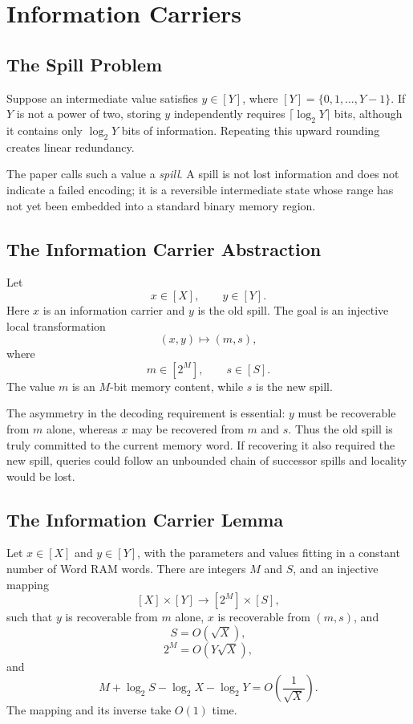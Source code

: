 \section{Information Carriers}
\label{sec:information-carriers}

\subsection{The Spill Problem}

Suppose an intermediate value satisfies \(y\in[Y]\), where
\([Y]=\{0,1,\ldots,Y-1\}\). If \(Y\) is not a power of two, storing \(y\)
independently requires \(\lceil\log_2Y\rceil\) bits, although it contains only
\(\log_2Y\) bits of information. Repeating this upward rounding creates
linear redundancy.

The paper calls such a value a \emph{spill}. A spill is not lost information
and does not indicate a failed encoding; it is a reversible intermediate
state whose range has not yet been embedded into a standard binary memory
region.

\subsection{The Information Carrier Abstraction}

Let
\[
    x\in[X],
    \qquad
    y\in[Y].
\]
Here \(x\) is an information carrier and \(y\) is the old spill. The goal is
an injective local transformation
\[
    (x,y)\longmapsto(m,s),
\]
where
\[
    m\in[2^M],
    \qquad
    s\in[S].
\]
The value \(m\) is an \(M\)-bit memory content, while \(s\) is the new spill.

The asymmetry in the decoding requirement is essential: \(y\) must be
recoverable from \(m\) alone, whereas \(x\) may be recovered from \(m\) and
\(s\). Thus the old spill is truly committed to the current memory word. If
recovering it also required the new spill, queries could follow an unbounded
chain of successor spills and locality would be lost.

\subsection{The Information Carrier Lemma}

\begin{lemma}
\label{lem:information-carrier}
Let \(x\in[X]\) and \(y\in[Y]\), with the parameters and values fitting in a
constant number of Word RAM words. There are integers \(M\) and \(S\), and an
injective mapping
\[
    [X]\times[Y]\longrightarrow[2^M]\times[S],
\]
such that \(y\) is recoverable from \(m\) alone, \(x\) is recoverable from
\((m,s)\), and
\[
    S=O(\sqrt X),
\]
\[
    2^M=O(Y\sqrt X),
\]
and
\[
    M+\log_2S-\log_2X-\log_2Y
    =O\left(\frac{1}{\sqrt X}\right).
\]
The mapping and its inverse take \(O(1)\) time.
\end{lemma}

